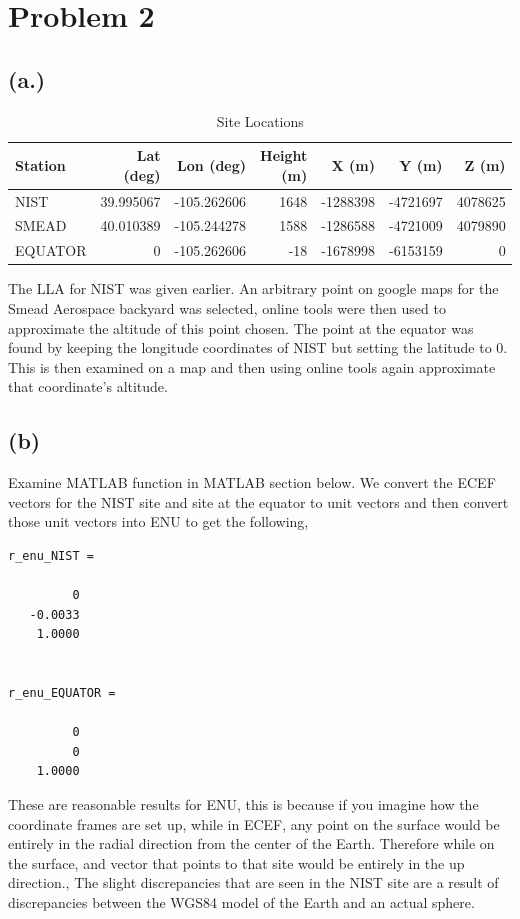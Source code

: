 \documentclass[11pt]{article}
\begin{document}
\section*{Problem 2}
\subsection*{(a.)}
\begin{table}[h]
    \centering
    \begin{tabular}{lrrrrrr}
        \hline
        Station & Lat (deg) & Lon (deg) & Height (m) & X (m) & Y (m) & Z (m) \\
        \hline
        NIST    & 39.995067 & -105.262606 & 1648 & -1288398 & -4721697 & 4078625 \\
        SMEAD   & 40.010389 & -105.244278 & 1588 & -1286588 & -4721009 & 4079890 \\
        EQUATOR & 0  & -105.262606 & -18  & -1678998 & -6153159 & 0 \\
        \hline
    \end{tabular}
    \caption{Site Locations}
    \label{tab:site_locations}
\end{table}

\hspace*{2em}The LLA for NIST was given earlier. An arbitrary point on google maps for the Smead Aerospace
backyard was selected, online tools were then used to approximate the altitude of this point chosen. 
The point at the equator was found by keeping the longitude coordinates of NIST but setting the latitude to 0. This
is then examined on a map and then using online tools again approximate that coordinate's altitude. 

\subsection*{(b)}
\hspace*{2em}Examine MATLAB function in MATLAB section below. We convert the ECEF vectors for the 
NIST site and site at the equator to unit
vectors and then convert those unit vectors into ENU to get the following,
\begin{verbatim}
r_enu_NIST =

         0
   -0.0033
    1.0000


r_enu_EQUATOR =

         0
         0
    1.0000
\end{verbatim}
\hspace*{2em}These are reasonable results for ENU, this is because if you imagine how the coordinate frames
are set up, while in ECEF, any point on the surface would be entirely in the radial direction from the center
of the Earth. Therefore while on the surface, and vector that points to that site would be entirely in the up direction.,
The slight discrepancies that are seen in the NIST site are a result of discrepancies between the WGS84 model of the Earth
and an actual sphere.
\end{document}
